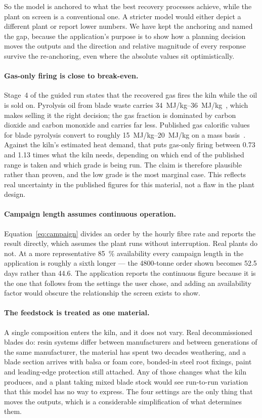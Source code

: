 So the model is anchored to what the best recovery processes achieve, while the plant on screen is a conventional one. A stricter model would either depict a different plant or report lower numbers. We have kept the anchoring and named the gap, because the application's purpose is to show how a planning decision moves the outputs and the direction and relative magnitude of every response survive the re-anchoring, even where the absolute values sit optimistically.

\paragraph{Gas-only firing is close to break-even.}
Stage~4 of the guided run states that the recovered gas fires the kiln while the oil is sold on. Pyrolysis oil from blade waste carries
\SIrange{34}{36}{MJ/kg}~\cite{akesson}, which makes selling it the right
decision; the gas fraction is dominated by carbon dioxide and carbon monoxide and carries far less. Published gas calorific values for blade pyrolysis convert to roughly \SIrange{15}{20}{MJ/kg} on a mass
basis~\cite{bladegas,torres}. Against the kiln's estimated heat demand, that puts gas-only firing between \num{0.73} and \num{1.13} times what the kiln needs, depending on which end of the published range is taken and which grade is being run. The claim is therefore plausible rather than proven, and the low grade is the most marginal case. This reflects real uncertainty in the published figures for this material, not a flaw in the plant design.

\paragraph{Campaign length assumes continuous operation.}
Equation~\ref{eq:campaign} divides an order by the hourly fibre rate and reports the result directly, which assumes the plant runs without interruption. Real plants do not. At a more representative \SI{85}{\%} availability every campaign length in the application is roughly a sixth longer --- the \num{4800}-tonne order shown becomes \num{52.5} days rather than \num{44.6}. The application reports the continuous figure because it is the one that follows from the settings the user chose, and adding an availability factor would obscure the relationship the screen exists to show.

\paragraph{The feedstock is treated as one material.}
A single composition enters the kiln, and it does not vary. Real decommissioned blades do: resin systems differ between manufacturers and between generations of the same manufacturer, the material has spent two decades weathering, and a blade section arrives with balsa or foam core, bonded-in steel root fixings, paint and leading-edge protection still attached. Any of those changes what the kiln produces, and a plant taking mixed blade stock would see run-to-run variation that this model has no way to express. The four settings are the only thing that
moves the outputs, which is a considerable simplification of what determines them.

